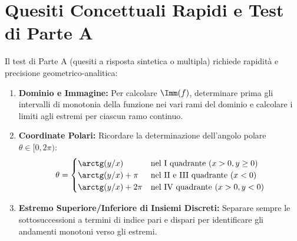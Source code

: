 \section{Quesiti Concettuali Rapidi e Test di Parte A}
\label{sec:esami_parteA}

\begin{esame}
Il test di Parte A (quesiti a risposta sintetica o multipla) richiede rapidità e precisione geometrico-analitica:
\begin{enumerate}
    \item \textbf{Dominio e Immagine:} Per calcolare $\Imm(f)$, determinare prima gli intervalli di monotonia della funzione nei vari rami del dominio e calcolare i limiti agli estremi per ciascun ramo continuo.
    \item \textbf{Coordinate Polari:} Ricordare la determinazione dell'angolo polare $\theta \in [0, 2\pi)$:
    \[
        \theta = \begin{cases}
            \arctg(y/x) & \text{nel I quadrante } (x > 0, y \ge 0) \\
            \arctg(y/x) + \pi & \text{nel II e III quadrante } (x < 0) \\
            \arctg(y/x) + 2\pi & \text{nel IV quadrante } (x > 0, y < 0)
        \end{cases}
    \]
    \item \textbf{Estremo Superiore/Inferiore di Insiemi Discreti:} Separare sempre le sottosuccessioni a termini di indice pari e dispari per identificare gli andamenti monotoni verso gli estremi.
\end{enumerate}
\end{esame}

